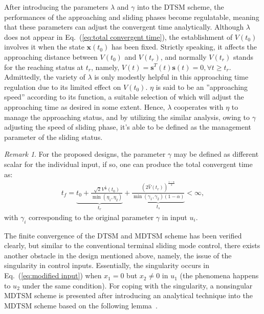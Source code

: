 \documentclass[3p]{elsarticle}
\theoremstyle{plain}
\theoremstyle{remark}
\newtheorem{myrem}{Remark}
\begin{document}
After introducing the parameters $\lambda$ and $\gamma$ into the DTSM scheme, the performances of the approaching and sliding phases become regulatable, meaning that these parameters can adjust the convergent time analytically. Although $\lambda$ does not appear in Eq.~(\ref{eq:total convergent time}), the establishment of $V(t_0)$ involves it when the state $\bm x(t_0)$ has been fixed. Strictly speaking, it affects the approaching distance between $V(t_0)$ and $V(t_r)$, and normally $V(t_r)$ stands for the reaching status at $t_r$, namely, $V(t)=\bm s^T(t)\bm s(t) = 0,\forall t\ge t_r$. Admittedly, the variety of $\lambda$ is only modestly helpful in this approaching time regulation due to its limited effect on $V(t_0)$. $\eta$ is said to be an ''approaching speed'' according to its function, a suitable selection of which will adjust the approaching time as desired in some extent. Hence, $\lambda$ cooperates with $\eta$ to manage the approaching status, and by utilizing the similar analysis, owing to $\gamma$ adjusting the speed of sliding phase, it's able to be defined as the management parameter of the sliding status.
\begin{myrem}
For the proposed designs, the parameter $\gamma$ may be defined as different scalar for the individual input, if so, one can produce the total convergent time as:
\begin{align}
t_f = \underbrace{t_0+\frac{\sqrt{2}V^{\frac{1}{2}}(t_0)}{\min(\eta_1,\eta_2)}}_{t_r}+\underbrace{\frac{(2\hat V(t_r))^{\frac{1-\alpha}{2}}}{\min(\gamma_1,\gamma_2)(1-\alpha)}}_{t_s}<\infty,\label{eq:normal total convergent time}
\end{align}
with $\gamma_i$ corresponding to the original parameter $\gamma$ in input $u_i$.
\end{myrem}
The finite convergence of the DTSM and MDTSM scheme has been verified clearly, but similar to the conventional terminal sliding mode control, there exists another obstacle in the design mentioned above, namely, the issue of the singularity in control inputs. Essentially, the singularity occurs in Eq.~(\ref{eq:modified input}) when $x_1=0$ but $x_2\neq 0$ in $u_1$ (the phenomena happens to $u_2$ under the same condition). For coping with the singularity, a nonsingular MDTSM scheme is presented after introducing an analytical technique into the MDTSM scheme based on the following lemma~\cite{feng2013nonsingular}.
\end{document}
